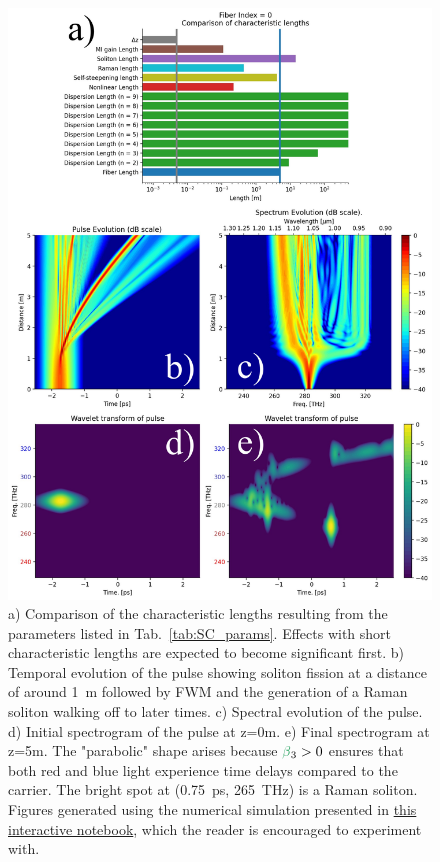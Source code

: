 \begin{figure}
    \centering
    \includegraphics[width=0.9\linewidth]{figures/SC_combined.png}
    \caption{a) Comparison of the characteristic lengths resulting from the parameters listed in Tab.~\ref{tab:SC_params}. Effects with short characteristic lengths are expected to become significant first. b) Temporal evolution of the pulse showing soliton fission at a distance of around 1~m followed by FWM and the generation of a Raman soliton walking off to later times. c) Spectral evolution of the pulse. d) Initial spectrogram of the pulse at z=0m. e) Final spectrogram at z=5m. The "parabolic" shape arises because $\betag_3>0$ ensures that both red and blue light experience time delays compared to the carrier. The bright spot at (0.75~ps, 265~THz) is a Raman soliton. Figures generated using the numerical simulation presented in \href{https://colab.research.google.com/drive/1HvA8F8yzEq-9fahuI4z2KhT-YhdRAXgt?usp=sharing}{this interactive notebook}, which the reader is encouraged to experiment with. }
    \label{fig:SC_combined}
\end{figure}

